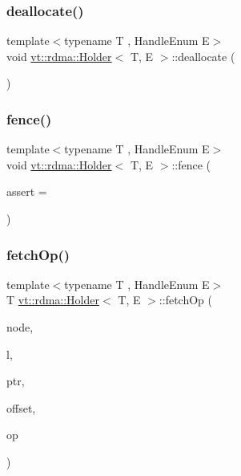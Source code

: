 \mbox{\label{structvt_1_1rdma_1_1_holder_afe6dd03862a68f941a44258aac9ef03d}} 
\subsubsection{\texorpdfstring{deallocate()}{deallocate()}}
{\footnotesize\ttfamily template$<$typename T , Handle\+Enum E$>$ \\
void \hyperlink{structvt_1_1rdma_1_1_holder}{vt\+::rdma\+::\+Holder}$<$ T, E $>$\+::deallocate (\begin{DoxyParamCaption}{ }\end{DoxyParamCaption})}

\mbox{\label{structvt_1_1rdma_1_1_holder_ae0131450f2f087c80faa444810aa25ed}} 
\subsubsection{\texorpdfstring{fence()}{fence()}}
{\footnotesize\ttfamily template$<$typename T , Handle\+Enum E$>$ \\
void \hyperlink{structvt_1_1rdma_1_1_holder}{vt\+::rdma\+::\+Holder}$<$ T, E $>$\+::fence (\begin{DoxyParamCaption}\item[{int}]{assert = {} }\end{DoxyParamCaption})}

\mbox{\label{structvt_1_1rdma_1_1_holder_a21514973be4a2a9107be043fe727d9f0}} 
\subsubsection{\texorpdfstring{fetch\+Op()}{fetchOp()}}
{\footnotesize\ttfamily template$<$typename T , Handle\+Enum E$>$ \\
T \hyperlink{structvt_1_1rdma_1_1_holder}{vt\+::rdma\+::\+Holder}$<$ T, E $>$\+::fetch\+Op (\begin{DoxyParamCaption}\item[{\hyperlink{namespacevt_a866da9d0efc19c0a1ce79e9e492f47e2}{vt\+::\+Node\+Type}}]{node,  }\item[{\hyperlink{namespacevt_1_1rdma_ac5c20b41a653e520b6305d4d454ecb70}{Lock}}]{l,  }\item[{T}]{ptr,  }\item[{int}]{offset,  }\item[{M\+P\+I\+\_\+\+Op}]{op }\end{DoxyParamCaption})}

